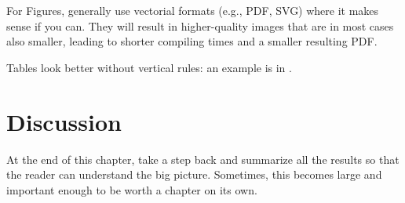 For Figures, generally use vectorial formats (e.g., PDF, SVG) where it makes sense if you can.
They will result in higher-quality images that are in most cases also smaller, leading to
shorter compiling times and a smaller resulting PDF.

Tables look better without vertical rules: an example is in .

\section{Discussion}

At the end of this chapter, take a step back and summarize all the results so that the reader
can understand the big picture. Sometimes, this becomes large and important enough to be worth
a chapter on its own.
